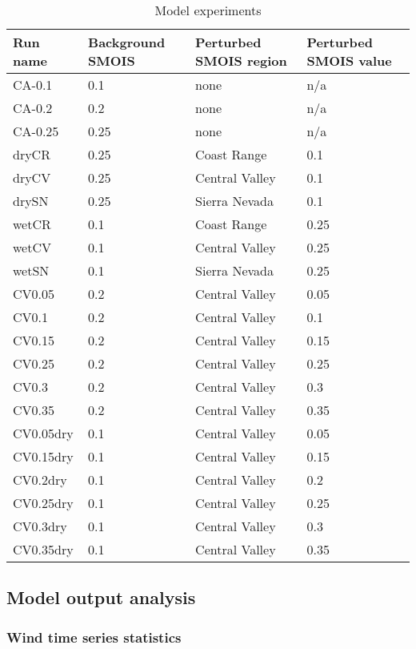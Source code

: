\begin{table}
\begin{tabular}{l l l l}
\hline
Run name & Background SMOIS & Perturbed SMOIS region & Perturbed SMOIS value \\
\hline
CA-0.1 & 0.1 & none & n/a \\
CA-0.2 & 0.2 & none & n/a \\
CA-0.25 & 0.25 & none & n/a \\
dryCR & 0.25 & Coast Range & 0.1 \\
dryCV & 0.25 & Central Valley & 0.1 \\
drySN & 0.25 & Sierra Nevada & 0.1 \\
wetCR & 0.1 & Coast Range & 0.25 \\
wetCV & 0.1 & Central Valley & 0.25 \\
wetSN & 0.1 & Sierra Nevada & 0.25 \\
CV0.05 & 0.2 & Central Valley & 0.05 \\
CV0.1 & 0.2 & Central Valley & 0.1 \\
CV0.15 & 0.2 & Central Valley & 0.15 \\
CV0.25 & 0.2 & Central Valley & 0.25 \\
CV0.3 & 0.2 & Central Valley & 0.3 \\
CV0.35 & 0.2 & Central Valley & 0.35 \\
CV0.05dry & 0.1 & Central Valley & 0.05 \\
CV0.15dry & 0.1 & Central Valley & 0.15 \\
CV0.2dry & 0.1 & Central Valley & 0.2 \\
CV0.25dry & 0.1 & Central Valley & 0.25 \\
CV0.3dry & 0.1 & Central Valley & 0.3 \\
CV0.35dry & 0.1 & Central Valley & 0.35 \\
\hline
\end{tabular}
\caption{Model experiments}
\label{table:windSol_runlist}
\end{table}

\subsection{Model output analysis}

\subsubsection{Wind time series statistics}
\label{subsubsec:WindStats}

